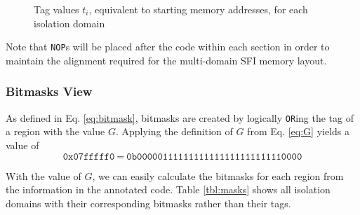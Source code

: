 \documentclass[12pt]{article}
\begin{document}
\begin{figure}[p]
\begin{drawstack}[scale=0.75]
	\footnotesize
	\startframe
		 
	\startframe
		 
	\startframe
		 
	\startframe
		 
	\startframe
		 
\end{drawstack}
\caption{Tag values $t_i$, equivalent to starting memory addresses, for each isolation domain} \label{domains_mem}
\end{figure}

Note that \texttt{NOP}s will be placed after the code within each section in order to maintain the alignment required for the multi-domain SFI memory layout.

\subsubsection{Bitmasks View}

As defined in Eq.  \ref{eq:bitmask}, bitmasks are created by logically \texttt{OR}ing the tag of a region with the value $G$. Applying the definition of $G$ from Eq. \ref{eq:G} yields a value of
$$ \texttt{0x07fffff0}\ =\ \texttt{0b00000111111111111111111111110000} $$

With the value of $G$, we can easily calculate the bitmasks for each region from the information in the annotated code. Table \ref{tbl:masks} shows all isolation domains with their corresponding bitmasks rather than their tags.
\end{document}

